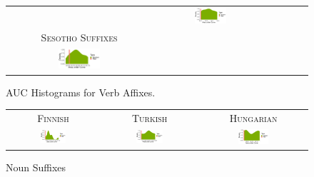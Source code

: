 \documentclass[11pt,letterpaper]{article}
\begin{document}
\begin{figure}
\begin{tabular}{cccccc}
        &
            \includegraphics[width=0.3\textwidth]{figures/sesotho_prefixes/suffixes-byMorphemes-auc-hist-heldout-Coarse-FineSurprisal-optimized.pdf}
            \\
            \textsc{Sesotho Suffixes} \\
            \includegraphics[width=0.3\textwidth]{figures/sesotho_suffixes/suffixes-byMorphemes-auc-hist-heldout-Coarse-FineSurprisal-optimized.pdf}
    \end{tabular}

    
    \caption{AUC Histograms for Verb Affixes.}
    \label{fig:my-label}
\end{figure}


\begin{figure}
\begin{tabular}{ccc}
\textsc{Finnish} & \textsc{Turkish} & \textsc{Hungarian} \\
    \includegraphics[width=0.3\textwidth]{figures/finnish_nouns/suffixes-byMorphemes-auc-hist-heldout-Coarse-FineSurprisal-optimized.pdf}
    &
    \includegraphics[width=0.3\textwidth]{figures/turkish_nouns/suffixes-byMorphemes-auc-hist-heldout-Coarse-FineSurprisal-optimized.pdf}
    &
    \includegraphics[width=0.3\textwidth]{figures/hungarian_nouns/suffixes-byMorphemes-auc-hist-heldout-Coarse-FineSurprisal-optimized.pdf}
    \end{tabular}
    \caption{Noun Suffixes}
    \label{fig:my-label}
\end{figure}
\end{document}
